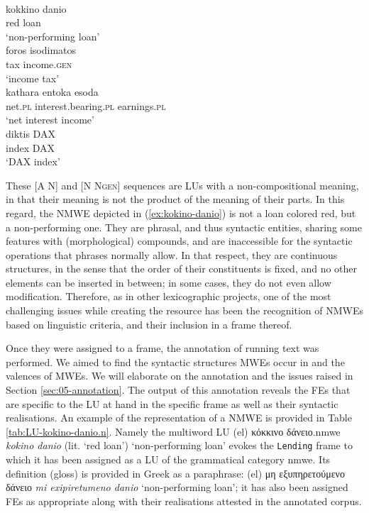 \documentclass[output=paper,colorlinks,citecolor=brown]{langscibook}
\begin{document}
\ea
\label{ex:kokino-danio}
\glll 
{}       	\\
kokkino        	danio\\
red             loan\\
\glt ‘non-performing loan’
\ex
\label{ex:foros-isodimatos}
\glll
{}           	\\
foros             	isodimatos\\
tax                	income.\textsc{gen}\\
\glt ‘income tax’
\ex
\label{ex:kathara-entoka-esoda}
\glll
{}         \\
kathara          	entoka                     	esoda\\
net.\textsc{{pl}}            	interest.bearing.\textsc{{pl}}  	earnings.\textsc{{pl}}\\
\glt ‘net interest income’
\ex
\label{ex:diktis-DAX}
\glll
{}       	\\
diktis            	DAX\\
index            	DAX\\
\glt ‘DAX index’\\
\z

These [A N] and [N N\textsc{gen}] sequences are LUs with a non-compositional meaning, in that their meaning is not the product of the meaning of their parts. In this regard, the NMWE depicted in (\ref{ex:kokino-danio}) is not a loan colored red, but a non-performing one. They are phrasal, and thus syntactic entities, sharing some features with (morphological) compounds, and are inaccessible for the syntactic operations that phrases normally allow. In that respect, they are continuous structures, in the sense that the order of their constituents is fixed, and no other elements can be inserted in between; in some cases, they do not even allow modification. Therefore, as in other lexicographic projects, one of the most challenging issues while creating the resource has been the recognition of NMWEs based on linguistic criteria, and their inclusion in a frame thereof.

Once they were assigned to a frame, the annotation of running text was performed. We aimed to find the syntactic structures MWEs occur in and the valences of MWEs. We will elaborate on the annotation and the issues raised in Section \ref{sec:05-annotation}. The output of this annotation reveals the FEs that are specific to the LU at hand in the specific frame as well as their syntactic realisations. An example of the representation of a NMWE is provided in Table \ref{tab:LU-kokino-danio.n}. Namely the multiword LU (el) κόκκινο δάνειο.nmwe \textit{kokino danio} (lit. `red loan') `non-performing loan' evokes the \texttt{Lending} frame to which it has been assigned as a LU of the grammatical category nmwe. Its definition (gloss) is provided in Greek as a paraphrase: (el) μη εξυπηρετούμενο δάνειο \textit{mi exipiretumeno danio} `non-performing loan'; it has also been assigned FEs as appropriate along with their realisations attested in the annotated corpus.
\end{document}
